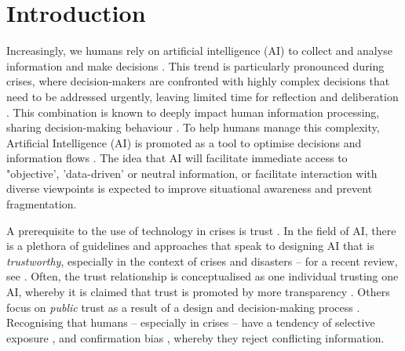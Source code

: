 \documentclass[pdflatex,sn-apa]{sn-jnl}%
\begin{document}



\maketitle

\section{Introduction}\label{sec1}
Increasingly, we humans rely on artificial intelligence (AI) to collect and analyse information and make decisions \citep{klingbeil2024trust}. This trend is particularly pronounced during crises, where decision-makers are confronted with highly complex decisions that need to be addressed urgently, leaving limited time for reflection and deliberation \citep{mendonca2001decision}. This combination is known to deeply impact human information processing, sharing decision-making behaviour \citep{comes2020coordination}. To help humans manage this complexity, Artificial Intelligence (AI) is promoted as a tool to optimise decisions and information flows \citep{jeon2024hearhere}. The idea that AI will facilitate immediate access to "objective', 'data-driven' or neutral information, or facilitate interaction with diverse viewpoints is expected to improve situational awareness and prevent fragmentation. 

A prerequisite to the use of technology in crises is trust \citep{steinbrink2024impact}. In the field of AI, there is a plethora of guidelines and approaches that speak to designing AI that is \textit{trustworthy}, especially in the context of crises and disasters -- for a recent review, see \citep{albahri2024systematic}. Often, the trust relationship is conceptualised as one individual trusting one AI, whereby it is claimed that trust is promoted by more transparency \citep{visave2025transparency}. Others focus on \textit{public} trust as a result of a design and decision-making process \citep{tzachor2020artificial}. Recognising that humans -- especially in crises -- have a tendency of selective exposure \citep{barbera2015tweeting}, and confirmation bias \citep{paulus2024interplay}, whereby they reject conflicting information. 
\end{document}
